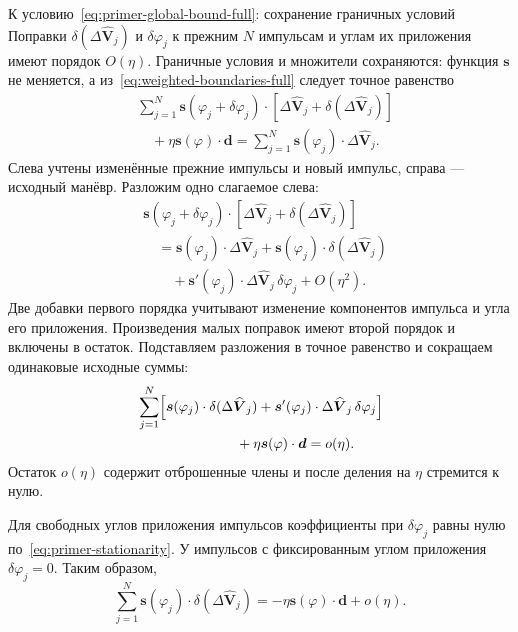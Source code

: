 \begin{explanation}{К условию~\eqref{eq:primer-global-bound-full}: сохранение граничных условий}
Поправки $\delta(\Delta\widehat{\boldsymbol V}_j)$ и $\delta\varphi_j$
к прежним $N$ импульсам и углам их приложения имеют порядок $O(\eta)$.
Граничные условия и множители сохраняются: функция $\boldsymbol s$
не меняется, а из~\eqref{eq:weighted-boundaries-full} следует
точное равенство
\[
\begin{aligned}
 &\sum_{j=1}^N\boldsymbol s(\varphi_j+\delta\varphi_j)\cdot
   \left[\Delta\widehat{\boldsymbol V}_j+
                    \delta(\Delta\widehat{\boldsymbol V}_j)\right]\\
 &\quad+\eta\boldsymbol s(\varphi)\cdot\boldsymbol d
   =\sum_{j=1}^N\boldsymbol s(\varphi_j)\cdot
                    \Delta\widehat{\boldsymbol V}_j.
\end{aligned}
\]
Слева учтены изменённые прежние импульсы и новый импульс,
справа --- исходный манёвр. Разложим одно слагаемое слева:
\[
\begin{aligned}
 &\boldsymbol s(\varphi_j+\delta\varphi_j)\cdot
   \left[\Delta\widehat{\boldsymbol V}_j+
                    \delta(\Delta\widehat{\boldsymbol V}_j)\right]\\
 &\quad=\boldsymbol s(\varphi_j)\cdot\Delta\widehat{\boldsymbol V}_j
      +\boldsymbol s(\varphi_j)\cdot
                    \delta(\Delta\widehat{\boldsymbol V}_j)\\
 &\qquad+\boldsymbol s'(\varphi_j)\cdot
                    \Delta\widehat{\boldsymbol V}_j\,\delta\varphi_j
      +O(\eta^2).
\end{aligned}
\]
Две добавки первого порядка учитывают изменение компонентов
импульса и угла его приложения. Произведения малых поправок имеют второй
порядок и включены в остаток. Подставляем разложения в точное
равенство и сокращаем одинаковые исходные суммы:
\[
\begin{aligned}
 &\sum_{j=1}^N\Bigl[
   \boldsymbol s(\varphi_j)\cdot
                   \delta(\Delta\widehat{\boldsymbol V}_j)
   +\boldsymbol s'(\varphi_j)\cdot
                   \Delta\widehat{\boldsymbol V}_j\,\delta\varphi_j
                  \Bigr]\\
 &\hspace{25mm}+\eta\boldsymbol s(\varphi)\cdot\boldsymbol d
      =o(\eta).
\end{aligned}
\]
Остаток $o(\eta)$ содержит отброшенные члены и после деления
на $\eta$ стремится к нулю.

Для свободных углов приложения импульсов коэффициенты при $\delta\varphi_j$
равны нулю по~\eqref{eq:primer-stationarity}.
У импульсов с фиксированным углом приложения $\delta\varphi_j=0$.
Таким образом,
\[
 \sum_{j=1}^N\boldsymbol s(\varphi_j)\cdot
                 \delta(\Delta\widehat{\boldsymbol V}_j)
 =-\eta\boldsymbol s(\varphi)\cdot\boldsymbol d+o(\eta).
\]
\end{explanation}

